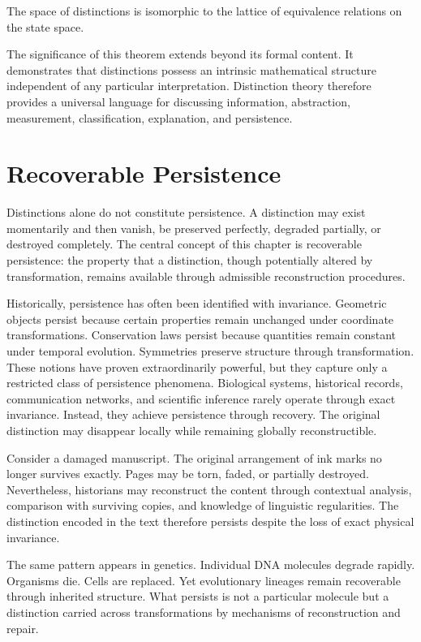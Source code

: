 \documentclass[12pt,oneside]{article}
\theoremstyle{definition}
\begin{document}
\begin{corollary}

The space of distinctions is isomorphic to the lattice of equivalence relations on the state space.

\end{corollary}

The significance of this theorem extends beyond its formal content. It demonstrates that distinctions possess an intrinsic mathematical structure independent of any particular interpretation. Distinction theory therefore provides a universal language for discussing information, abstraction, measurement, classification, explanation, and persistence.

\section{Recoverable Persistence}

Distinctions alone do not constitute persistence. A distinction may exist momentarily and then vanish, be preserved perfectly, degraded partially, or destroyed completely. The central concept of this chapter is recoverable persistence: the property that a distinction, though potentially altered by transformation, remains available through admissible reconstruction procedures.

Historically, persistence has often been identified with invariance. Geometric objects persist because certain properties remain unchanged under coordinate transformations. Conservation laws persist because quantities remain constant under temporal evolution. Symmetries preserve structure through transformation. These notions have proven extraordinarily powerful, but they capture only a restricted class of persistence phenomena. Biological systems, historical records, communication networks, and scientific inference rarely operate through exact invariance. Instead, they achieve persistence through recovery. The original distinction may disappear locally while remaining globally reconstructible.

Consider a damaged manuscript. The original arrangement of ink marks no longer survives exactly. Pages may be torn, faded, or partially destroyed. Nevertheless, historians may reconstruct the content through contextual analysis, comparison with surviving copies, and knowledge of linguistic regularities. The distinction encoded in the text therefore persists despite the loss of exact physical invariance.

The same pattern appears in genetics. Individual DNA molecules degrade rapidly. Organisms die. Cells are replaced. Yet evolutionary lineages remain recoverable through inherited structure. What persists is not a particular molecule but a distinction carried across transformations by mechanisms of reconstruction and repair.
\end{document}
